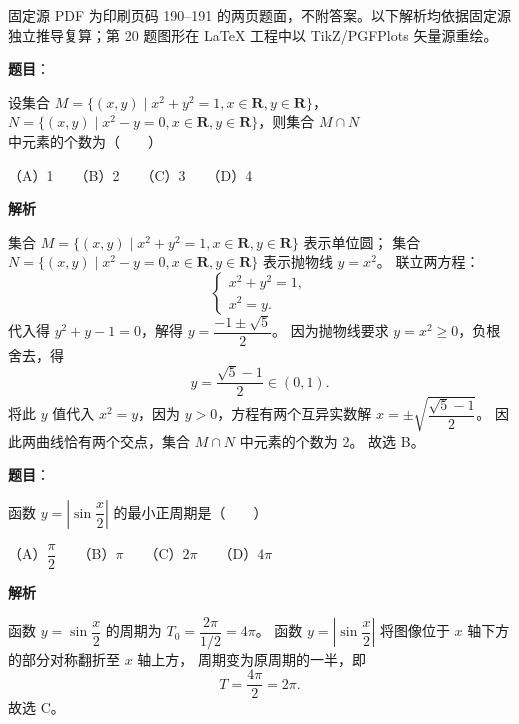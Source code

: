 

\begin{gktip}
固定源 PDF 为印刷页码 190–191 的两页题面，不附答案。以下解析均依据固定源独立推导复算；第 20 题图形在 LaTeX 工程中以 TikZ/PGFPlots 矢量源重绘。
\end{gktip}

\begin{answer}

\textbf{题目}：

设集合 $M=\{(x,y)\mid x^2+y^2=1,x\in\mathbf{R},y\in\mathbf{R}\}$，$N=\{(x,y)\mid x^2-y=0,x\in\mathbf{R},y\in\mathbf{R}\}$，则集合 $M\cap N$ 中元素的个数为\mbox{（　　）}

（A）1　　（B）2　　（C）3　　（D）4

\textbf{解析}

集合 $M=\{(x,y)\mid x^2+y^2=1,x\in\mathbf{R},y\in\mathbf{R}\}$ 表示单位圆；
集合 $N=\{(x,y)\mid x^2-y=0,x\in\mathbf{R},y\in\mathbf{R}\}$ 表示抛物线 $y=x^2$。
联立两方程：
\nopagebreak[4]
\[
\begin{cases}
x^2+y^2=1,\\
x^2=y.
\end{cases}
\]
代入得 $y^2+y-1=0$，解得 $y=\dfrac{-1\pm\sqrt{5}}{2}$。
因为抛物线要求 $y=x^2\geqslant 0$，负根舍去，得
\nopagebreak[4]
\[
y=\frac{\sqrt{5}-1}{2}\in(0,1).
\]
将此 $y$ 值代入 $x^2=y$，因为 $y>0$，方程有两个互异实数解 $x=\pm\sqrt{\dfrac{\sqrt{5}-1}{2}}$。
因此两曲线恰有两个交点，集合 $M\cap N$ 中元素的个数为 2。
故选 B。


\end{answer}
\begin{answer}

\textbf{题目}：

函数 $y=\left|\sin\dfrac{x}{2}\right|$ 的最小正周期是\mbox{（　　）}

（A）$\dfrac{\pi}{2}$　　（B）$\pi$　　（C）$2\pi$　　（D）$4\pi$

\textbf{解析}

函数 $y=\sin\dfrac{x}{2}$ 的周期为 $T_0=\dfrac{2\pi}{1/2}=4\pi$。
函数 $y=\left|\sin\dfrac{x}{2}\right|$ 将图像位于 $x$ 轴下方的部分对称翻折至 $x$ 轴上方，
周期变为原周期的一半，即
\nopagebreak[4]
\[
T=\frac{4\pi}{2}=2\pi.
\]
故选 C。


\end{answer}

